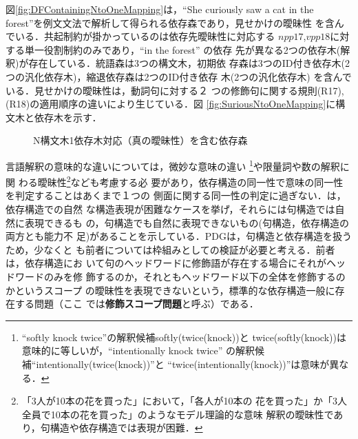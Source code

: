 図\ref{fig:DFContainingNtoOneMapping}は，``She curiously saw a cat in
the forest''を例文文法で解析して得られる依存森であり，見せかけの曖昧性
を含んでいる．共起制約が掛かっているのは依存先曖昧性に対応する
$npp17$,$vpp18$に対する単一役割制約のみであり，``in the forest'' の依存
先が異なる2つの依存木(解釈)が存在している．統語森は3つの構文木，初期依
存森は3つのID付き依存木(2つの汎化依存木)，縮退依存森は2つのID付き依存
木(2つの汎化依存木) を含んでいる．見せかけの曖昧性は，動詞句に対する２
つの修飾句に関する規則(R17),(R18)の適用順序の違いにより生じている．図
\ref{fig:SuriousNtoOneMapping}に構文木と依存木を示す．

\begin{comment}
====== Number of various trees ========
[Parse Forest]
(a) Parse Forest Size : 19
(b) Number of collection of parse trees : 3
(c) Number of set of parse trees : 3
[Dependency Forest]
(I-1) Initial DF size : 12
(I-2) Initial DF ID-tree collection number : 3
(I-3) Initial DF ID-tree set number : 3
(I-4) Initial DF Generalized-tree number : 2
(R-1) Reduced DF size : 9
(R-2) Reduced DF ID-tree collection number : 2
(R-3) Reduced DF ID-tree set number : 2
(R-4) Reduced DF Generalized-tree number : 2
\end{comment}

\begin{figure}[b]
\begin{center}
\end{center}
\myfiglabelskip
\caption{N構文木1依存木対応（真の曖昧性）を含む依存森}
\label{fig:DFContainingNtoOneMappingRealAmbiguity}
\end{figure}

言語解釈の意味的な違いについては，微妙な意味の違い\cite{Eisner96b}
\footnote{``softly knock twice''の解釈候補softly(twice(knock))と
twice(softly(knock))は意味的に等しいが，``intentionally knock twice'' 
の解釈候補``intentionally(twice(knock))''と
``twice(intentionally(knock))''は意味が異なる．}や限量詞や数の解釈に関
わる曖昧性\footnote{「3人が10本の花を買った」において，「各人が10本の
花を買った」か「3人全員で10本の花を買った」のようなモデル理論的な意味
解釈の曖昧性であり，句構造や依存構造では表現が困難．}なども考慮する必
要があり，依存構造の同一性で意味の同一性を判定することはあくまで１つの
側面に関する同一性の判定に過ぎない．\cite{Meluk88}は，依存構造での自然
な構造表現が困難なケースを挙げ，それらには句構造では自然に表現できるも
の，句構造でも自然に表現できないもの(句構造，依存構造の両方とも能力不
足)があることを示している．PDGは，句構造と依存構造を扱うため，少なくと
も前者については枠組みとしての検証が必要と考える．前者は，依存構造にお
いて句のヘッドワードに修飾語が存在する場合にそれがヘッドワードのみを修
飾するのか，それともヘッドワード以下の全体を修飾するのかというスコープ
の曖昧性を表現できないという，標準的な依存構造一般に存在する問題（ここ
では{\bf 修飾スコープ問題}と呼ぶ）である．

